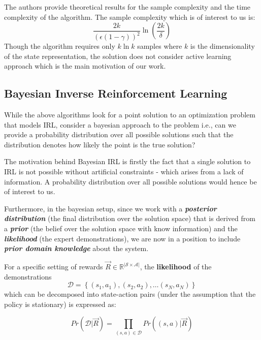 The authors provide theoretical results for the sample complexity and the time complexity of the algorithm. The sample complexity which is of interest to us is:
\begin{equation}
\frac{2k}{(\epsilon(1-\gamma))^2}\ln \left(\frac{2k}{\delta}\right)
\end{equation}
Though the algorithm requires only $k \ln k$ samples where $k$ is the dimensionality of the state representation, the solution does not consider active learning approach which is the main motivation of our work. 


\subsection{Bayesian Inverse Reinforcement Learning}
\label{sec:bayesian}
While the above algorithms look for a point solution to an optimization problem that models IRL, \citet{Ramachandran:2007:BIR:1625275.1625692} consider a bayesian approach to the problem i.e., 	can we provide a probability distribution over all possible solutions such that the distribution denotes how likely the point is the true solution? 

The motivation behind Bayesian IRL is firstly the fact that a single solution to IRL is not possible without artificial constraints - which arises from a lack of information. A probability distribution over all possible solutions would hence be of interest to us. 

Furthermore, in the bayesian setup, since we work with a \textbf{\textit{posterior distribution}} (the final distribution over the solution space) that is derived
 from a \textbf{\textit{prior}} (the belief over the solution space with know information) and the \textit{\textbf{likelihood} }(the expert demonstrations), we are now in a position to include \textit{\textbf{prior domain knowledge}} about the system. 
 
For a specific setting of rewards $\vec{R} \in \mathbb{R}^{|\mathcal{S} \times \mathcal{A}|}$, the \textbf{likelihood} of the demonstrations \[\mathcal{D} = \left\lbrace (s_1,a_1)  ,  (s_2,a_2), \hdots (s_N, a_N) \right\rbrace\] which can be decomposed into state-action pairs (under the assumption that the policy is stationary) is expressed as:

\begin{equation}
Pr(\mathcal{D} | \vec{R}) = \displaystyle\prod_{(s,a) \in \mathcal{D}} Pr( (s,a) | \vec{R})
\end{equation}

